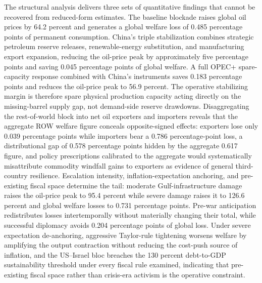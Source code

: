 \documentclass[12pt]{article}
\begin{document}
The structural analysis delivers three sets of quantitative findings that cannot be recovered from reduced-form estimates. The baseline blockade raises global oil prices by 64.2 percent and generates a global welfare loss of 0.485 percentage points of permanent consumption. China's triple stabilization combines strategic petroleum reserve releases, renewable-energy substitution, and manufacturing export expansion, reducing the oil-price peak by approximately five percentage points and saving 0.045 percentage points of global welfare. A full OPEC+ spare-capacity response combined with China's instruments saves 0.183 percentage points and reduces the oil-price peak to 56.9 percent. The operative stabilizing margin is therefore spare physical production capacity acting directly on the missing-barrel supply gap, not demand-side reserve drawdowns. Disaggregating the rest-of-world block into net oil exporters and importers reveals that the aggregate ROW welfare figure conceals opposite-signed effects: exporters lose only 0.039 percentage points while importers bear a 0.786 percentage-point loss, a distributional gap of 0.578 percentage points hidden by the aggregate 0.617 figure, and policy prescriptions calibrated to the aggregate would systematically misattribute commodity windfall gains to exporters as evidence of general third-country resilience. Escalation intensity, inflation-expectation anchoring, and pre-existing fiscal space determine the tail: moderate Gulf-infrastructure damage raises the oil-price peak to 95.4 percent while severe damage raises it to 126.6 percent and global welfare losses to 0.731 percentage points. Pre-war anticipation redistributes losses intertemporally without materially changing their total, while successful diplomacy avoids 0.204 percentage points of global loss. Under severe expectation de-anchoring, aggressive Taylor-rule tightening worsens welfare by amplifying the output contraction without reducing the cost-push source of inflation, and the US--Israel bloc breaches the 130 percent debt-to-GDP sustainability threshold under every fiscal rule examined, indicating that pre-existing fiscal space rather than crisis-era activism is the operative constraint.
\end{document}
